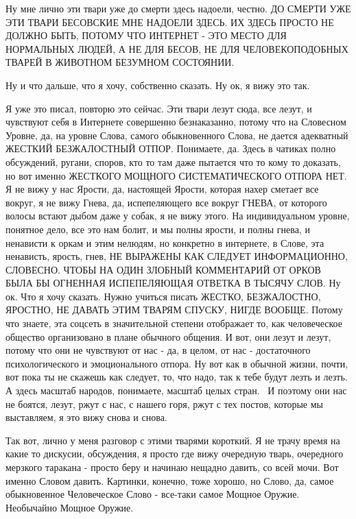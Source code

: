 Ну мне лично эти твари уже до смерти здесь надоели, честно. ДО СМЕРТИ УЖЕ ЭТИ
ТВАРИ БЕСОВСКИЕ МНЕ НАДОЕЛИ ЗДЕСЬ. ИХ ЗДЕСЬ ПРОСТО НЕ ДОЛЖНО БЫТЬ, ПОТОМУ ЧТО
ИНТЕРНЕТ - ЭТО МЕСТО ДЛЯ НОРМАЛЬНЫХ ЛЮДЕЙ, А НЕ ДЛЯ БЕСОВ, НЕ ДЛЯ
ЧЕЛОВЕКОПОДОБНЫХ ТВАРЕЙ В ЖИВОТНОМ БЕЗУМНОМ СОСТОЯНИИ.

Ну и что дальше, что я хочу, собственно сказать. Ну ок, я вижу это так. 

Я уже это писал, повторю это сейчас. Эти твари лезут сюда, все лезут, и
чувствуют себя в Интернете совершенно безнаказанно, потому что на Словесном
Уровне, да, на уровне Слова, самого обыкновенного Слова, не дается адекватный
ЖЕСТКИЙ БЕЗЖАЛОСТНЫЙ ОТПОР. Понимаете, да. Здесь в чатиках полно обсуждений,
ругани, споров, кто то там даже пытается что то кому то доказать, но вот именно
ЖЕСТКОГО МОЩНОГО СИСТЕМАТИЧЕСКОГО ОТПОРА НЕТ. Я не вижу у нас Ярости, да,
настоящей Ярости, которая нахер сметает все вокруг, я не вижу Гнева, да,
испепеляющего все вокруг ГНЕВА, от которого волосы встают дыбом даже у собак, я
не вижу этого. На индивидуальном уровне, понятное дело, все это нам болит, и мы
полны ярости, и полны гнева, и ненависти к оркам и этим нелюдям, но конкретно в
интернете, в Слове, эта ненависть, ярость, гнев, НЕ ВЫРАЖЕНЫ КАК СЛЕДУЕТ
ИНФОРМАЦИОННО, СЛОВЕСНО. ЧТОБЫ НА ОДИН ЗЛОБНЫЙ КОММЕНТАРИЙ ОТ ОРКОВ БЫЛА БЫ
ОГНЕННАЯ ИСПЕПЕЛЯЮЩАЯ ОТВЕТКА В ТЫСЯЧУ СЛОВ. Ну ок. Что я хочу сказать. Нужно
учиться писать ЖЕСТКО, БЕЗЖАЛОСТНО, ЯРОСТНО, НЕ ДАВАТЬ ЭТИМ ТВАРЯМ СПУСКУ,
НИГДЕ ВООБЩЕ. Потому что знаете, эта соцсеть в значительной степени отображает
то, как человеческое общество организовано в плане обычного общения. И вот, они
лезут и лезут, потому что они не чувствуют от нас - да, в целом, от нас -
достаточного психологического и эмоционального отпора. Ну вот как в обычной
жизни, почти, вот пока ты не скажешь как следует, то, что надо, так к тебе
будут лезть и лезть. А здесь масштаб народов, понимаете, масштаб целых стран. 
И поэтому они нас не боятся, лезут, ржут с нас, с нашего горя, ржут с тех
постов, которые мы выставляем, я это вижу снова и снова. 

Так вот, лично у меня разговор с этими тварями короткий. Я не трачу время на
какие то дискусии, обсуждения, я просто где вижу очередную тварь, очередного
мерзкого таракана - просто беру и начинаю нещадно давить, со всей мочи. Вот
именно Словом давить. Картинки, конечно, тоже хорошо, но Слово, да, самое
обыкновенное Человеческое Слово - все-таки самое Мощное Оружие. Необычайно
Мощное Оружие.


